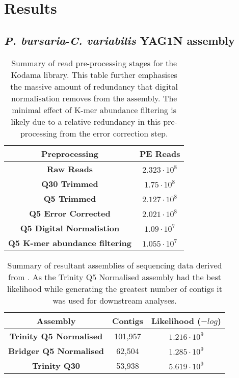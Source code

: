 \section{Results}

\subsection{\textit{P. bursaria}-\textit{C. variabilis} YAG1N assembly}

\begin{table}
    \centering
    \begin{tabular}{|c|c|}
        \hline
        \textbf{Preprocessing} & \textbf{PE Reads} \\
        \hline
        \textbf{Raw Reads}  & \(2.323\cdot10^{8}\)\\
        \textbf{Q30 Trimmed} & \(1.75\cdot10^{8}\)\\
        \textbf{Q5 Trimmed}  & \(2.127\cdot10^{8} \) \\
        \textbf{Q5 Error Corrected}  & \(2.021\cdot10^{8}\)\\
        \textbf{Q5 Digital Normalistion} & \(1.09 \cdot10^{7}\)\\ 
        \textbf{Q5 K-mer abundance filtering} & \(1.055\cdot10^{7}\)\\
        \hline
    \end{tabular}
    \caption[Results of various types of pre-processing for the YADG1N transcriptome]{
        Summary of read pre-processing stages for the Kodama library.  This
        table further emphasises the massive amount of redundancy that digital normalisation 
        removes from the assembly. The minimal effect of K-mer abundance filtering
        is likely due to a relative redundancy in this pre-processing from the error
    correction step.}
    \label{tab:kodama_preproc}
\end{table}

\begin{table}
    \centering
    \begin{tabular}{|c|c|c|}
        \hline
        \textbf{Assembly} & \textbf{Contigs} & \textbf{Likelihood (\(-log\))}\\
        \hline
        \textbf{Trinity Q5 Normalised}  & 101,957 & \(1.216\cdot10^9\)\\
        \textbf{Bridger Q5 Normalised} & 62,504 & \(1.285\cdot10^9\)\\
        \textbf{Trinity Q30} & 53,938  & \(5.619\cdot10^{9} \) \\
        \hline
    \end{tabular}
    \caption[Summary of YADG1N Transcriptome Assemblies]{Summary of resultant 
    assemblies of sequencing data derived from \citep{Kodama2014c}.  As the
Trinity Q5 Normalised assembly had the best likelihood while generating
the greatest number of contigs it was used for downstream analyses.}
    \label{tab:kodama_assembly}
\end{table}

